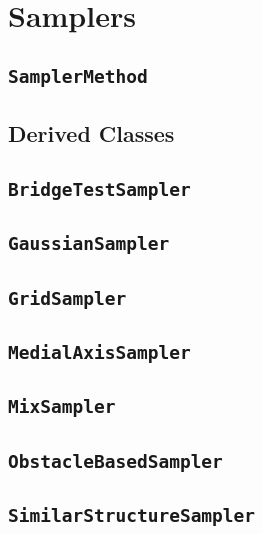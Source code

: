 \chapter{Samplers}

\section{\texttt{SamplerMethod}}

\section{Derived Classes}

\section{\texttt{BridgeTestSampler}}

\section{\texttt{GaussianSampler}}

\section{\texttt{GridSampler}}

\section{\texttt{MedialAxisSampler}}

\section{\texttt{MixSampler}}

\section{\texttt{ObstacleBasedSampler}}

\section{\texttt{SimilarStructureSampler}}

